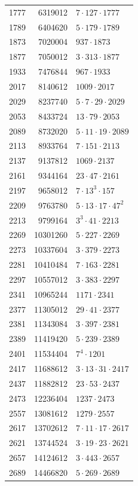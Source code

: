 \documentclass[11pt]{article}
\begin{document}
{\begin{longtable}{r r l}
1777 & 6319012 & \(7\cdot127\cdot1777\) \\
1789 & 6404620 & \(5\cdot179\cdot1789\) \\
1873 & 7020004 & \(937\cdot1873\) \\
1877 & 7050012 & \(3\cdot313\cdot1877\) \\
1933 & 7476844 & \(967\cdot1933\) \\
2017 & 8140612 & \(1009\cdot2017\) \\
2029 & 8237740 & \(5\cdot7\cdot29\cdot2029\) \\
2053 & 8433724 & \(13\cdot79\cdot2053\) \\
2089 & 8732020 & \(5\cdot11\cdot19\cdot2089\) \\
2113 & 8933764 & \(7\cdot151\cdot2113\) \\
2137 & 9137812 & \(1069\cdot2137\) \\
2161 & 9344164 & \(23\cdot47\cdot2161\) \\
2197 & 9658012 & \(7\cdot13^{3}\cdot157\) \\
2209 & 9763780 & \(5\cdot13\cdot17\cdot47^{2}\) \\
2213 & 9799164 & \(3^{3}\cdot41\cdot2213\) \\
2269 & 10301260 & \(5\cdot227\cdot2269\) \\
2273 & 10337604 & \(3\cdot379\cdot2273\) \\
2281 & 10410484 & \(7\cdot163\cdot2281\) \\
2297 & 10557012 & \(3\cdot383\cdot2297\) \\
2341 & 10965244 & \(1171\cdot2341\) \\
2377 & 11305012 & \(29\cdot41\cdot2377\) \\
2381 & 11343084 & \(3\cdot397\cdot2381\) \\
2389 & 11419420 & \(5\cdot239\cdot2389\) \\
2401 & 11534404 & \(7^{4}\cdot1201\) \\
2417 & 11688612 & \(3\cdot13\cdot31\cdot2417\) \\
2437 & 11882812 & \(23\cdot53\cdot2437\) \\
2473 & 12236404 & \(1237\cdot2473\) \\
2557 & 13081612 & \(1279\cdot2557\) \\
2617 & 13702612 & \(7\cdot11\cdot17\cdot2617\) \\
2621 & 13744524 & \(3\cdot19\cdot23\cdot2621\) \\
2657 & 14124612 & \(3\cdot443\cdot2657\) \\
2689 & 14466820 & \(5\cdot269\cdot2689\) \\

\end{longtable}}
\end{document}
